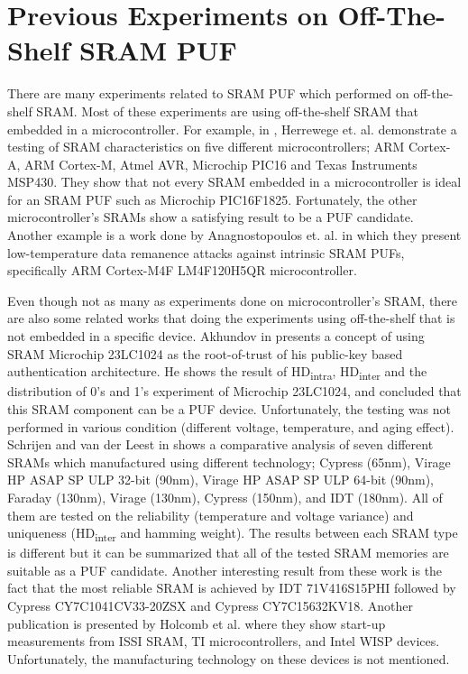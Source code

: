 \section{Previous Experiments on Off-The-Shelf SRAM PUF}\label{ch:prev_experiments}
There are many experiments related to SRAM PUF which performed on off-the-shelf SRAM. Most of these experiments are using off-the-shelf SRAM that embedded in a microcontroller. For example, in \cite{VanHerrewege:2013:DIP:2541806.2512493}, Herrewege et. al. demonstrate a testing of SRAM characteristics on five different microcontrollers; ARM Cortex-A, ARM Cortex-M, Atmel AVR, Microchip PIC16 and Texas Instruments MSP430. They show that not every SRAM embedded in a microcontroller is ideal for an SRAM PUF such as Microchip PIC16F1825. Fortunately, the other microcontroller's SRAMs show a satisfying result to be a PUF candidate.
Another example is a work done by Anagnostopoulos et. al. \cite{cryptoeprint:2016:769} in which they present low-temperature data remanence attacks against intrinsic SRAM PUFs, specifically ARM Cortex-M4F LM4F120H5QR microcontroller.

Even though not as many as experiments done on microcontroller's SRAM, there are also some related works that doing the experiments using off-the-shelf that is not embedded in a specific device. Akhundov in \cite{haji} presents a concept of using SRAM Microchip 23LC1024 as the root-of-trust of his public-key based authentication architecture. He shows the result of HD\textsubscript{intra}, HD\textsubscript{inter} and the distribution of 0's and 1's experiment of Microchip 23LC1024, and concluded that this SRAM component can be a PUF device. Unfortunately, the testing was not performed in various condition (different voltage, temperature, and aging effect).
Schrijen and van der Leest in \cite{Schrijen:2012:CAS:2492708.2493033} shows a comparative analysis of seven different SRAMs which manufactured using different technology; Cypress  (65nm),
Virage HP ASAP SP ULP 32-bit (90nm), Virage HP ASAP SP ULP 64-bit (90nm), Faraday  (130nm), Virage  (130nm), Cypress  (150nm), and IDT  (180nm). All of them are tested on the reliability (temperature and voltage variance) and uniqueness (HD\textsubscript{inter} and hamming weight). The results between each SRAM type is different but it can be summarized that all of the tested SRAM memories are suitable as a PUF candidate. Another interesting result from these work is the fact that the most reliable SRAM is achieved by IDT 71V416S15PHI followed by Cypress CY7C1041CV33-20ZSX and Cypress CY7C15632KV18.
Another publication is presented by Holcomb et al. \cite{4674345} where they show start-up measurements from ISSI SRAM, TI microcontrollers, and Intel WISP devices. Unfortunately, the manufacturing technology on these devices is not mentioned.
